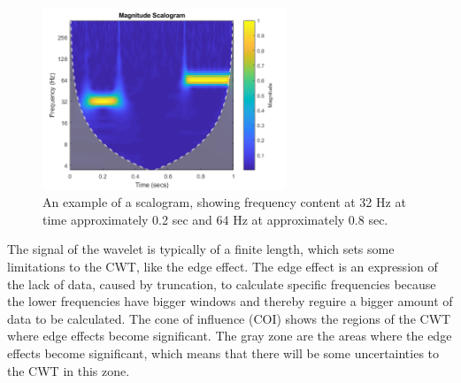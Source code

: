\begin{figure}[H]
	\centering	\includegraphics[width=0.65\textwidth]{figures/scalogram}
	\caption{An example of a scalogram, showing frequency content at 32 Hz at time approximately 0.2 sec and 64 Hz at approximately 0.8 sec. \cite{mathworks2017}}
	\label{fig:scalogram}
\end{figure} \vspace{-.3cm}

The signal of the wavelet is typically of a finite length, which sets some limitations to the CWT, like the edge effect. The edge effect is an expression of the lack of data, caused by truncation, to calculate specific frequencies because the lower frequencies have bigger windows and thereby reguire a bigger amount of data to be calculated.\cite{mari1999} The cone of influence (COI) shows the regions of the CWT where edge effects become significant. The gray zone are the areas where the edge effects become significant, which means that there will be some uncertainties to the CWT in this zone. \cite{mathworks2017}


